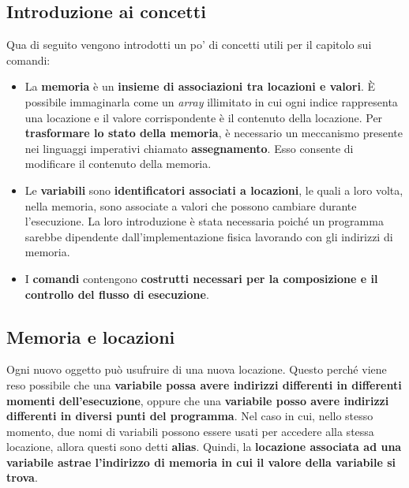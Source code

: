 \documentclass[a4paper]{article}
\begin{document}
	\subsection{Introduzione ai concetti}
	
	Qua di seguito vengono introdotti un po' di concetti utili per il capitolo sui comandi:
	\begin{itemize}
		\item La \textcolor{Red3}{\textbf{memoria}} è un \textbf{insieme di associazioni tra locazioni e valori}. È possibile immaginarla come un \emph{array} illimitato in cui ogni indice rappresenta una locazione e il valore corrispondente è il contenuto della locazione.\newline
		Per \textbf{trasformare lo stato della memoria}, è necessario un meccanismo presente nei linguaggi imperativi chiamato \textbf{assegnamento}. Esso consente di modificare il contenuto della memoria.
		
		\item Le \textcolor{Red3}{\textbf{variabili}} sono \textbf{identificatori associati a locazioni}, le quali a loro volta, nella memoria, sono associate a valori che possono cambiare durante l'esecuzione.\newline
		La loro introduzione è stata necessaria poiché un programma sarebbe dipendente dall'implementazione fisica lavorando con gli indirizzi di memoria.
		
		\item I \textcolor{Red3}{\textbf{comandi}} contengono \textbf{costrutti necessari per la composizione e il controllo del flusso di esecuzione}.
	\end{itemize}\newpage

	\subsection{Memoria e locazioni}
	
	Ogni nuovo oggetto può usufruire di una nuova locazione. Questo perché viene reso possibile che una \textbf{variabile possa avere indirizzi differenti in differenti momenti dell'esecuzione}, oppure che una \textbf{variabile posso avere indirizzi differenti in diversi punti del programma}. Nel caso in cui, nello stesso momento, due nomi di variabili possono essere usati per accedere alla stessa locazione, allora questi sono detti \textbf{alias}.\newline
	Quindi, la \textbf{locazione associata ad una variabile astrae l'indirizzo di memoria in cui il valore della variabile si trova}.\newline
	
\end{document}
